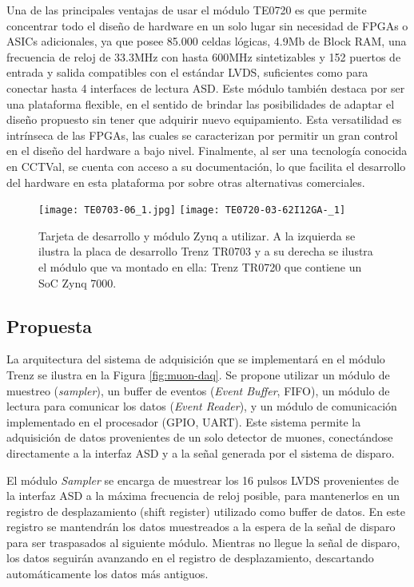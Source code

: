 		Una de las principales ventajas de usar el módulo TE0720 es que permite concentrar todo el diseño de hardware en un solo lugar sin necesidad de FPGAs o ASICs adicionales, ya que posee 85.000 celdas lógicas, 4.9Mb de Block RAM, una frecuencia de reloj de 33.3MHz con hasta 600MHz sintetizables y 152 puertos de entrada y salida compatibles con el estándar LVDS, suficientes como para conectar hasta 4 interfaces de lectura ASD. Este módulo también destaca por ser una plataforma flexible, en el sentido de brindar las posibilidades de adaptar el diseño propuesto sin tener que adquirir nuevo equipamiento. Esta versatilidad es intrínseca de las FPGAs, las cuales se caracterizan por permitir un gran control en el diseño del hardware a bajo nivel. Finalmente, al ser una tecnología conocida en CCTVal, se cuenta con acceso a su documentación, lo que facilita el desarrollo del hardware en esta plataforma por sobre otras alternativas comerciales.
		
		\begin{figure}[H]
			\centering
			\texttt{[image: TE0703-06\_1.jpg]}
			\texttt{[image: TE0720-03-62I12GA-\_1]}
			\caption{Tarjeta de desarrollo y módulo Zynq a utilizar. A la izquierda se ilustra la placa de desarrollo Trenz TR0703\cite{TrenzElectronic2019TE0703Wiki} y a su derecha se ilustra el módulo que va montado en ella: Trenz TR0720\cite{TrenzElectronic2020TE0720Wiki} que contiene un SoC Zynq 7000\cite{}.}
			\label{fig:trenz}
		\end{figure}
	
	\subsection{Propuesta}
		La arquitectura del sistema de adquisición que se implementará en el módulo Trenz se ilustra en la Figura \ref{fig:muon-daq}. Se propone utilizar un módulo de muestreo (\textit{sampler}), un buffer de eventos (\textit{Event Buffer}, FIFO), un módulo de lectura para comunicar los datos (\textit{Event Reader}), y un módulo de comunicación implementado en el procesador (GPIO, UART). Este sistema permite la adquisición de datos provenientes de un solo detector de muones, conectándose directamente a la interfaz ASD y a la señal generada por el sistema de disparo.
		
		El módulo \textit{Sampler} se encarga de muestrear los 16 pulsos LVDS provenientes de la interfaz ASD a la máxima frecuencia de reloj posible, para mantenerlos en un registro de desplazamiento (shift register) utilizado como buffer de datos. En este registro se mantendrán los datos muestreados a la espera de la señal de disparo para ser traspasados al siguiente módulo. Mientras no llegue la señal de disparo, los datos seguirán avanzando en el registro de desplazamiento, descartando automáticamente los datos más antiguos.
		
